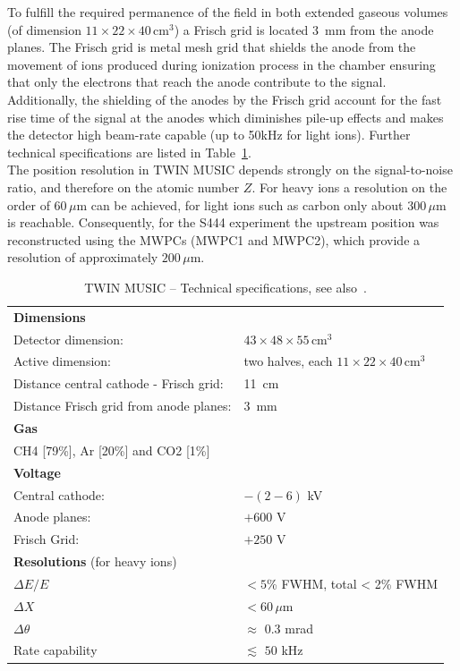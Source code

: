 To fulfill the required permanence of the field in both extended gaseous volumes (of dimension $11\times22\times40\,\text{cm}^3$) a Frisch grid is located 3~mm from the anode planes. The Frisch grid is metal mesh grid that shields the anode from the movement of ions produced during ionization process in the chamber ensuring that only the electrons that reach the anode contribute to the signal. Additionally, the shielding of the anodes by the Frisch grid account for the fast rise time of the signal at the anodes which diminishes pile-up effects and makes the detector high beam-rate capable (up to 50kHz for light ions). Further technical specifications are listed in Table~\ref{table:twin_tecs}.\\
The position resolution in TWIN MUSIC depends strongly on the signal-to-noise ratio, and therefore on the atomic number $Z$. For heavy ions a resolution on the order of $60\,\mu$m can be achieved, for light ions such as carbon only about $300\,\mu$m is reachable. Consequently, for the S444 experiment the upstream position was reconstructed using the MWPCs (MWPC1 and MWPC2), which provide a resolution of approximately $200\,\mu$m.
\newline
\begin{table}[h!]
    \fontsize{10pt}{10pt}\selectfont
    \centering
    \begin{tabular}{ll}
        \hline
        \textbf{Dimensions} & \\ 
	Detector dimension: & $43\times48\times55\, \text{cm}^3$ \\ 
	Active dimension: & two halves, each $11\times22\times40\,\text{cm}^3$\\
	Distance central cathode - Frisch grid: & 11~cm\\
	Distance Frisch grid from anode planes: & 3~mm\\ %
	\textbf{Gas} &\\
	CH4 [79\%], Ar [20\%] and CO2 [1\%] \\
	\textbf{Voltage} & \\
	Central cathode: &  $-(2-6)$ kV \\
	Anode planes: & $+600$ V \\
	Frisch Grid: & $+250$ V\\
	\textbf{Resolutions} (for heavy ions) & \\
	$\Delta E / E$ & $< 5$\% FWHM, total < 2\% FWHM \\
	$\Delta X$ & $< 60\, \mu$m\\
	$\Delta \theta$ & $\approx$ 0.3 mrad\\[10pt] 
	Rate capability & $\lesssim$ $50$ kHz \\
	\hline
    \end{tabular}
    \caption{TWIN MUSIC -- Technical specifications, see also~\cite{martin2021fission}.}
	\label{table:twin_tecs}
\end{table}
\newline
    

